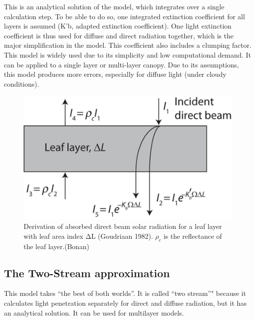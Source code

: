 \documentclass[
  12pt,
  oneside]{book}
\begin{document}
This is an analytical solution of the model, which integrates over a single calculation step. To be able to do so, one integrated extinction coefficient for all layers is assumed (K'b, adapted extinction coefficient). One light extinction coefficient is thus used for diffuse and direct radiation together, which is the major simplification in the model. This coefficient also includes a clumping factor. This model is widely used due to its simplicity and low computational demand. It can be applied to a single layer or multi-layer canopy. Due to its assumptions, this model produces more errors, especially for diffuse light (under cloudy conditions).

\begin{figure}

{\centering \includegraphics[width=0.8\linewidth]{figures/chap3/f320_goudriaan} 

}

\caption{ Derivation of absorbed direct beam solar radiation for a leaf layer with leaf area index ΔL (Goudriaan 1982). $ρ_c$ is the reflectance of the leaf layer.(Bonan)}\label{fig:f320}
\end{figure}

\hypertarget{the-two-stream-approximation}{%
\subsection{The Two-Stream approximation}\label{the-two-stream-approximation}}

This model takes ``the best of both worlds''. It is called ``two stream''" because it calculates light penetration separately for direct and diffuse radiation, but it has an analytical solution. It can be used for multilayer models.
\end{document}
